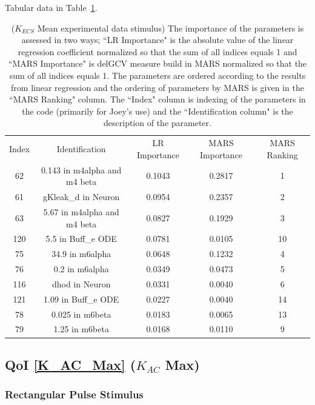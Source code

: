 \documentclass[12pt]{article}
\numberwithin{equation}{section}
\begin{document}
Tabular data in Table~\ref{qoi_K_ECS_Mean_ex}.


\begin{table}[h]
\centering
\begin{tabular}{ccccc}
Index & Identification & LR Importance & MARS Importance & MARS Ranking \\
62 & 0.143 in m4alpha and m4 beta &  0.1043 & 0.2817 & 1\\
61 & gKleak\_d in Neuron & 0.0954 & 0.2357 &  2\\
63 &   5.67 in m4alpha and m4 beta & 0.0827 & 0.1929 & 3\\
120 & 5.5 in Buff\_e ODE & 0.0781 & 0.0105 & 10\\
75 & 34.9 in m6alpha & 0.0648 & 0.1232 & 4\\
76 & 0.2 in m6alpha & 0.0349 & 0.0473 & 5\\
116 & dhod in Neuron & 0.0331 & 0.0040 & 6\\
121 & 1.09 in Buff\_e ODE & 0.0227 & 0.0040 & 14\\
78 & 0.025 in m6beta & 0.0183 &  0.0065 & 13\\
79 & 1.25 in m6beta & 0.0168 & 0.0110 & 9\\
\end{tabular}
\caption{($K_{ECS}$ Mean experimental data stimulus) The importance of the parameters is assessed in two ways; ``LR Importance" is the absolute value of the linear regression coefficient normalized so that the sum of all indices equals 1 and ``MARS Importance" is delGCV measure build in MARS normalized so that the sum of all indices equals 1. The parameters are ordered according to the results from linear regression and the ordering of parameters by MARS is given in the ``MARS Ranking" column. The ``Index" column is indexing of the parameters in the code (primarily for Joey's use) and the ``Identification column" is the description of the parameter.}
\label{qoi_K_ECS_Mean_ex}
\end{table}

\newpage
\subsection{QoI \eqref{K_AC_Max} ($K_{AC}$ Max)}

\subsubsection{Rectangular Pulse Stimulus}
\end{document}
